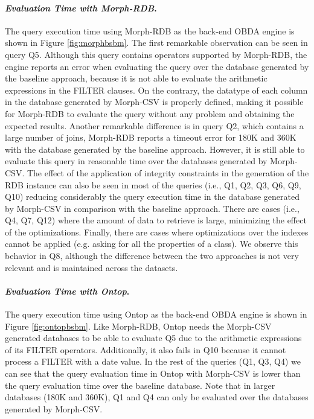 \noindent\paragraph*{\textit{Evaluation Time with Morph-RDB}.} The query execution time using Morph-RDB as the back-end OBDA engine is shown in Figure \ref{fig:morphbsbm}. The first remarkable observation can be seen in query Q5. Although this query contains operators supported by Morph-RDB, the engine reports an error when evaluating the query over the database generated by the baseline approach, because it is not able to evaluate the arithmetic expressions in the FILTER clauses. On the contrary, the datatype of each column in the database generated by Morph-CSV is properly defined, making it possible for Morph-RDB to evaluate the query without any problem and obtaining the expected results. Another remarkable difference is in query Q2, which contains a large number of joins, Morph-RDB reports a timeout error for 180K and 360K with the database generated by the baseline approach. However, it is still able to evaluate this query in reasonable time over the databases generated by Morph-CSV. The effect of the application of integrity constraints in the generation of the RDB instance can also be seen in most of the queries (i.e., Q1, Q2, Q3, Q6, Q9, Q10) reducing considerably the query execution time in the database generated by Morph-CSV in comparison with the baseline approach. There are cases (i.e., Q4, Q7, Q12) where the amount of data to retrieve is large, minimizing the effect of the optimizations. Finally, there are cases where optimizations over the indexes cannot be applied (e.g. asking for all the properties of a class). We observe this behavior in Q8, although the difference between the two approaches is not very relevant and is maintained across the datasets. 

\noindent\paragraph*{\textit{Evaluation Time with Ontop}.}
The query execution time using Ontop as the back-end OBDA engine is shown in Figure \ref{fig:ontopbsbm}. Like Morph-RDB, Ontop needs the Morph-CSV generated databases to be able to evaluate Q5 due to the arithmetic expressions of its FILTER operators. Additionally, it also fails in Q10 because it cannot process a FILTER with a date value. In the rest of the queries (Q1, Q3, Q4) we can see that the query evaluation time in Ontop with Morph-CSV is lower than the query evaluation time over the baseline database. Note that in larger databases (180K and 360K), Q1 and Q4 can only be evaluated over the databases generated by Morph-CSV. 

